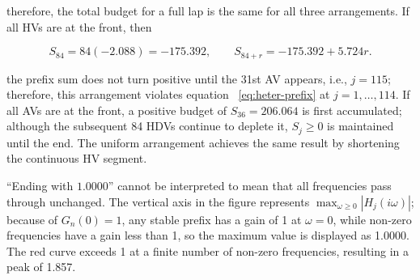 \documentclass[11pt,a4paper,openany]{book}
\numberwithin{equation}{chapter}
\numberwithin{figure}{chapter}
\numberwithin{table}{chapter}
\begin{document}
therefore, the total budget for a full lap is the same for all three arrangements. If all HVs are at the front, then

\[
S_{84}=84(-2.088)=-175.392,
\qquad
S_{84+r}=-175.392+5.724r.
\]

the prefix sum does not turn positive until the 31st AV appears, i.e., $j=115$; therefore, this arrangement violates equation ~\eqref{eq:heter-prefix} at $j=1,\ldots,114$. If all AVs are at the front, a positive budget of $S_{36}=206.064$ is first accumulated; although the subsequent 84 HDVs continue to deplete it, $S_j\ge0$ is maintained until the end. The uniform arrangement achieves the same result by shortening the continuous HV segment.




“Ending with $1.0000$” cannot be interpreted to mean that all frequencies pass through unchanged. The vertical axis in the figure represents $\max_{\omega\ge0}|H_j(i\omega)|$; because of $G_n(0)=1$, any stable prefix has a gain of 1 at $\omega=0$, while non-zero frequencies have a gain less than 1, so the maximum value is displayed as 1.0000. The red curve exceeds 1 at a finite number of non-zero frequencies, resulting in a peak of 1.857.
\end{document}
